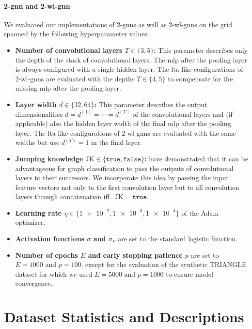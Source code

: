 \paragraph{2-\acs{gnn} and 2-\acs{wl}-\acs{gnn}}
We evaluated our implementations of 2-\acsp{gnn} as well as 2-\acs{wl}-\acsp{gnn} on the grid spanned by the following hyperparameter values:
\begin{itemize}[itemsep=2pt,parsep=2pt]
	\item \textbf{Number of convolutional layers $T \in \{ 3, 5 \}$:}
		This parameter describes only the depth of the stack of convolutional layers.
		The \ac{mlp} after the pooling layer is always configured with a single hidden layer.
		The \acs{lta}-like configurations of 2-\acs{wl}-\acsp{gnn} are evaluated with the depths $T \in \{ 4, 5 \}$ to compensate for the missing \ac{mlp} after the pooling layer.
	\item \textbf{Layer width $d \in \{ 32, 64 \}$:}
		This parameter describes the output dimensionalities $d = d^{(1)} = \cdots = d^{(T)}$ of the convolutional layers and (if applicable) also the hidden layer width of the final \ac{mlp} after the pooling layer.
		The \acs{lta}-like configurations of 2-\acs{wl}-\acsp{gnn} are evaluated with the same widths but use $d^{(T)} = 1$ in the final layer.
	\item \textbf{Jumping knowledge $\mathrm{JK} \in \{ \mathtt{true}, \mathtt{false} \}$:}
		\citet{Xu2018a} have demonstrated that it can be advantageous for graph classification to pass the outputs of convolutional layers to their successors.
		We incorporate this idea by passing the input feature vectors not only to the first convolution layer but to all convolution layers through concatenation iff.\ $\mathrm{JK} = \mathtt{true}$.
	\item \textbf{Learning rate $\eta \in \{ \num{1e-2}, \num{1e-3}, \num{1e-4} \}$} of the Adam optimizer.
	\item \textbf{Activation functions $\sigma$ and $\sigma_{\Gamma}$} are set to the standard logistic function.
	\item \textbf{Number of epochs $E$ and early stopping patience $p$} are set to $E = 1000$ and $p = 100$, except for the evaluation of the synthetic TRIANGLE dataset for which we used $E = 5000$ and $p = 1000$ to ensure model convergence.
\end{itemize}

\section{Dataset Statistics and Descriptions}%
\label{sec:appendix:ds-stats}

